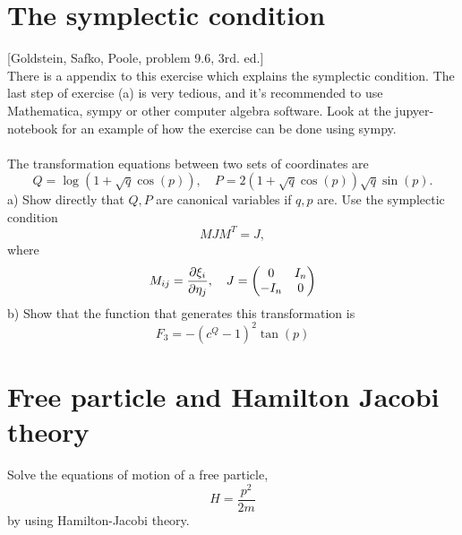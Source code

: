 \documentclass{article}
\begin{document}
    \section{The symplectic condition}
        [Goldstein, Safko, Poole, problem 9.6, 3rd. ed.] \\
        There is a appendix to this exercise which explains the symplectic condition. The last step of exercise (a) is very tedious, and it's recommended to use Mathematica, sympy or other computer algebra software. Look at the jupyer-notebook for an example of how the exercise can be done using sympy. \\ \\
        The transformation equations between two sets of coordinates are
        \begin{equation*}
            Q = \log\left(1 + \sqrt{q} \cos(p)\right), \quad P = 2\left(1 + \sqrt{q}\cos(p)\right)\sqrt{q}\sin(p).
        \end{equation*}
        a) Show directly that $Q, P$ are canonical variables if $q, p$ are. Use the symplectic condition 
        \begin{equation*}
            M J M^T = J,
        \end{equation*}
        where 
        \begin{equation*}
            M_{ij} = \pdv{\xi_i}{\eta_j}, \quad
            J = \begin{pmatrix*}
                0 & I_n \\
                -I_n & 0 \\
            \end{pmatrix*}
        \end{equation*}
        b) Show that the function that generates this transformation is 
        \begin{equation*}
            F_3 = -(c^Q - 1)^2 \tan(p)
        \end{equation*}

    \section{Free particle and Hamilton Jacobi theory}
        Solve the equations of motion of a free particle, 
        \begin{equation*}
            H = \frac{p^2}{2m}
        \end{equation*}
        by using Hamilton-Jacobi theory.
\end{document}
